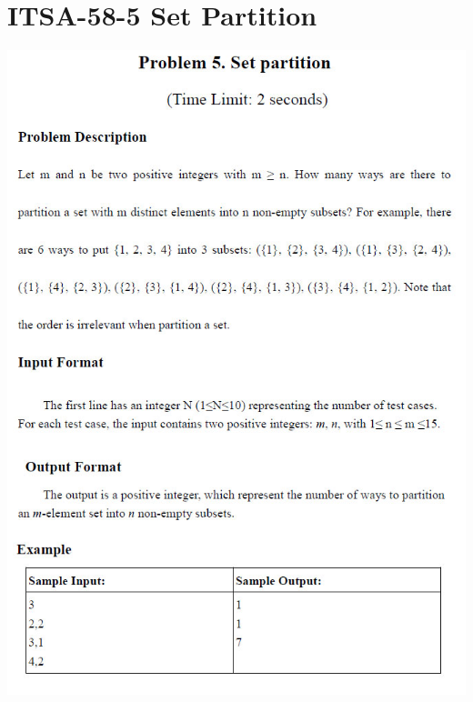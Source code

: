 \section{ITSA-58-5 Set Partition}
\centerline{\includegraphics[height=.95\textheight]{../solutions/fig/58ITSA5}}

